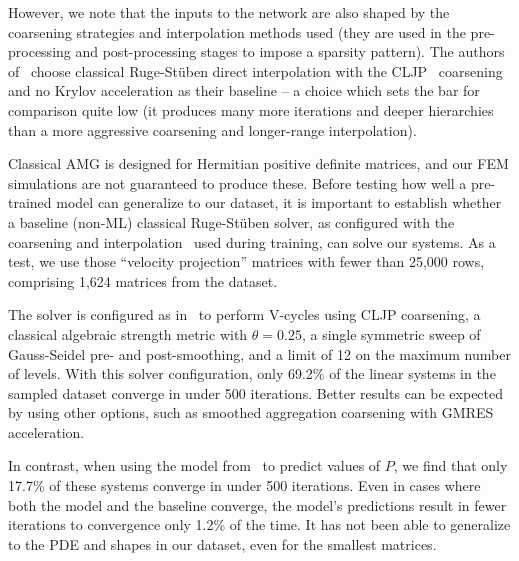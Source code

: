 \documentclass{svproc}
\begin{document}
However, we note that the inputs to the network are also shaped by the coarsening strategies and interpolation methods used (they are used in the pre-processing and post-processing stages to impose a sparsity pattern). The authors of~\cite{Luz2020} choose classical Ruge-St\"uben direct interpolation with the CLJP~\cite{cleary1998coarse} coarsening and no Krylov acceleration as their baseline -- a choice which sets the bar for comparison quite low (it produces many more iterations and deeper hierarchies than a more aggressive coarsening and longer-range interpolation). 

Classical AMG is designed for Hermitian positive definite matrices, and our FEM simulations are not guaranteed to produce these.  Before testing how well a pre-trained model can generalize to our dataset, it is important to establish whether a baseline (non-ML) classical Ruge-St\"uben solver, as configured with the coarsening and interpolation~\cite{Luz2020} used during training, can solve our systems. As a test, we use those ``velocity projection'' matrices with fewer than 25,000 rows, comprising 1,624 matrices from the dataset. 

The solver is configured as in~\cite{Luz2020} to perform V-cycles using CLJP coarsening, a classical algebraic strength metric with $\theta=0.25$, a single symmetric sweep of Gauss-Seidel pre- and post-smoothing, and a limit of 12 on the maximum number of levels. With this solver configuration, only 69.2\% of the linear systems in the sampled dataset converge in under 500 iterations. Better results can be expected by using other options, such as smoothed aggregation coarsening with GMRES acceleration. 


In contrast, when using the model from~\cite{Luz2020} to predict values of $P$, we find that only 17.7\% of these systems converge in under 500 iterations. Even in cases where both the model and the baseline converge, the model's predictions result in fewer iterations to convergence only 1.2\% of the time. It has not been able to generalize to the PDE and shapes in our dataset, even for the smallest matrices.
\end{document}
